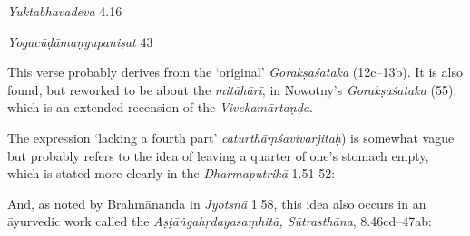 \begin{ekdosis}
\begin{sources}[hp01_058]
\end{sources}

\begin{testimonia}[hp01_058]
\emph{Yuktabhavadeva} 4.16

\begin{versinnote}
\end{versinnote}

\emph{Yogacūḍāmaṇyupaniṣat} 43

\begin{versinnote}
\end{versinnote}

\end{testimonia}

\begin{philcomm}[hp01_058]
This verse probably derives from the ‘original’ \emph{Gorakṣaśataka} (12c–13b). It is also found, but reworked to be about the \emph{mitāhārī}, in Nowotny’s \emph{Gorakṣaśataka} (55), which is an extended recension of the \emph{Vivekamārtaṇḍa}. 

The expression `lacking a fourth part' \emph{caturthāṃśavivarjitaḥ}) is somewhat vague but probably refers to the idea of leaving a quarter of one's stomach empty, which is stated more clearly in the \emph{Dharmaputrikā} 1.51-52:

\begin{versinnote}
\end{versinnote}

And, as noted by Brahmānanda in \emph{Jyotsnā} 1.58, this idea also occurs in an āyurvedic work called the \emph{Aṣṭāṅgahṛdayasaṃhitā, Sūtrasthāna}, 8.46cd–47ab: 

\begin{versinnote}
\end{versinnote} 


\end{philcomm}
\end{ekdosis}
